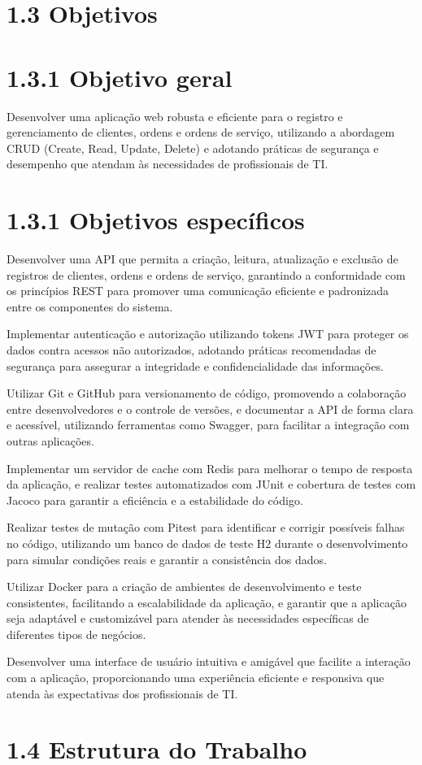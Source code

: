 \section*{1.3 Objetivos}

\section*{1.3.1 Objetivo geral}

Desenvolver uma aplicação web robusta e eficiente para o registro e gerenciamento de clientes, ordens e ordens de serviço, utilizando a abordagem CRUD (Create, Read, Update, Delete) e adotando práticas de segurança e desempenho que atendam às necessidades de profissionais de TI.

\section*{1.3.1 Objetivos específicos}

Desenvolver uma API que permita a criação, leitura, atualização e exclusão de registros de clientes, ordens e ordens de serviço, garantindo a conformidade com os princípios REST para promover uma comunicação eficiente e padronizada entre os componentes do sistema.

Implementar autenticação e autorização utilizando tokens JWT para proteger os dados contra acessos não autorizados, adotando práticas recomendadas de segurança para assegurar a integridade e confidencialidade das informações.

Utilizar Git e GitHub para versionamento de código, promovendo a colaboração entre desenvolvedores e o controle de versões, e documentar a API de forma clara e acessível, utilizando ferramentas como Swagger, para facilitar a integração com outras aplicações.

Implementar um servidor de cache com Redis para melhorar o tempo de resposta da aplicação, e realizar testes automatizados com JUnit e cobertura de testes com Jacoco para garantir a eficiência e a estabilidade do código.

Realizar testes de mutação com Pitest para identificar e corrigir possíveis falhas no código, utilizando um banco de dados de teste H2 durante o desenvolvimento para simular condições reais e garantir a consistência dos dados.

Utilizar Docker para a criação de ambientes de desenvolvimento e teste consistentes, facilitando a escalabilidade da aplicação, e garantir que a aplicação seja adaptável e customizável para atender às necessidades específicas de diferentes tipos de negócios.

Desenvolver uma interface de usuário intuitiva e amigável que facilite a interação com a aplicação, proporcionando uma experiência eficiente e responsiva que atenda às expectativas dos profissionais de TI.

\section*{1.4 Estrutura do Trabalho}

















